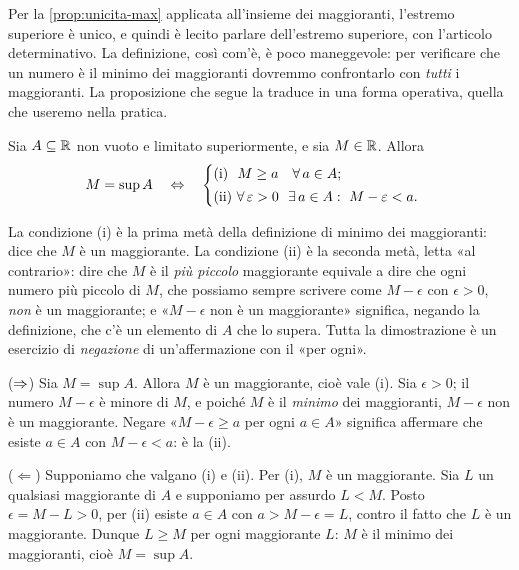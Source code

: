 Per la \cref{prop:unicita-max} applicata all'insieme dei maggioranti, l'estremo
superiore è unico, e quindi è lecito parlare dell'estremo superiore, con l'articolo
determinativo. La
definizione, così com'è, è poco maneggevole: per verificare che un numero è il minimo
dei maggioranti dovremmo confrontarlo con \emph{tutti} i maggioranti. La proposizione
che segue la traduce in una forma operativa, quella che useremo nella pratica.

\begin{proposizione}\label{prop:caratt-sup}
Sia $A\subseteq\mathbb{R}$ non vuoto e limitato superiormente, e sia $M\in\mathbb{R}$. Allora
\begin{equation}\label{eq:caratt-sup}
  M=\sup A \quad\sse\quad
  \begin{cases}
    \text{(i)}\ \ M\ge a \quad \perogni a\in A;\\[2pt]
    \text{(ii)}\ \perogni\epsilon>0\ \ \esiste a\in A : \ M-\epsilon<a.
  \end{cases}
\end{equation}
\end{proposizione}

\begin{schema}
\end{schema}

\begin{strategia}
La condizione (i) è la prima metà della definizione di minimo dei maggioranti: dice che
$M$ è un maggiorante. La condizione (ii) è la seconda metà, letta «al contrario»: dire
che $M$ è il \emph{più piccolo} maggiorante equivale a dire che ogni numero più piccolo
di $M$, che possiamo sempre scrivere come $M-\epsilon$ con $\epsilon>0$, \emph{non} è un
maggiorante; e «$M-\epsilon$ non è un maggiorante» significa, negando la definizione,
che c'è un elemento di $A$ che lo supera. Tutta la dimostrazione è un esercizio di
\emph{negazione} di un'affermazione con il «per ogni».
\end{strategia}

\begin{dimostrazione}
($\Rightarrow$) Sia $M=\sup A$. Allora $M$ è un maggiorante, cioè vale (i). Sia $\epsilon>0$;
il numero $M-\epsilon$ è minore di $M$, e poiché $M$ è il \emph{minimo} dei maggioranti,
$M-\epsilon$ non è un maggiorante. Negare «$M-\epsilon\ge a$ per ogni $a\in A$» significa
affermare che esiste $a\in A$ con $M-\epsilon<a$: è la (ii).

($\Leftarrow$) Supponiamo che valgano (i) e (ii). Per (i), $M$ è un maggiorante. Sia
$L$ un qualsiasi maggiorante di $A$ e supponiamo per assurdo $L<M$. Posto
$\epsilon=M-L>0$, per (ii) esiste $a\in A$ con $a>M-\epsilon=L$, contro il fatto che $L$ è
un maggiorante. Dunque $L\ge M$ per ogni maggiorante $L$: $M$ è il minimo dei
maggioranti, cioè $M=\sup A$.
\end{dimostrazione}

